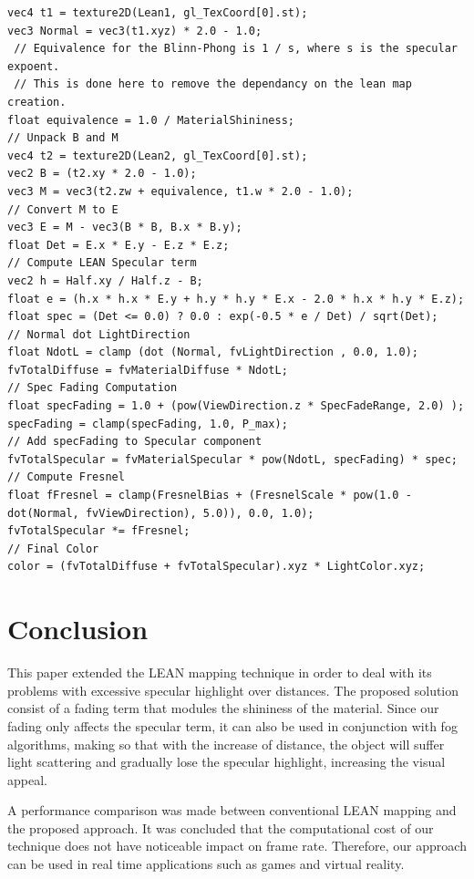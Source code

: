 \documentclass[10pt, conference]{IEEEtran}
\begin{document}
\lstset{basicstyle=\footnotesize,xleftmargin=20pt,numbers=left, breaklines=true, language=C, caption=GLSL pseudo code for specular fading applied in LEAN shader in tangent space., label=GLSLCode}
\begin{lstlisting}
vec4 t1 = texture2D(Lean1, gl_TexCoord[0].st);
vec3 Normal = vec3(t1.xyz) * 2.0 - 1.0;
 // Equivalence for the Blinn-Phong is 1 / s, where s is the specular expoent. 
 // This is done here to remove the dependancy on the lean map creation.
float equivalence = 1.0 / MaterialShininess;
// Unpack B and M
vec4 t2 = texture2D(Lean2, gl_TexCoord[0].st);
vec2 B = (t2.xy * 2.0 - 1.0);
vec3 M = vec3(t2.zw + equivalence, t1.w * 2.0 - 1.0);
// Convert M to E
vec3 E = M - vec3(B * B, B.x * B.y);
float Det = E.x * E.y - E.z * E.z;
// Compute LEAN Specular term
vec2 h = Half.xy / Half.z - B;
float e = (h.x * h.x * E.y + h.y * h.y * E.x - 2.0 * h.x * h.y * E.z);
float spec = (Det <= 0.0) ? 0.0 : exp(-0.5 * e / Det) / sqrt(Det);
// Normal dot LightDirection
float NdotL = clamp (dot (Normal, fvLightDirection , 0.0, 1.0);
fvTotalDiffuse = fvMaterialDiffuse * NdotL;
// Spec Fading Computation
float specFading = 1.0 + (pow(ViewDirection.z * SpecFadeRange, 2.0) );
specFading = clamp(specFading, 1.0, P_max);
// Add specFading to Specular component
fvTotalSpecular = fvMaterialSpecular * pow(NdotL, specFading) * spec;
// Compute Fresnel
float fFresnel = clamp(FresnelBias + (FresnelScale * pow(1.0 - dot(Normal, fvViewDirection), 5.0)), 0.0, 1.0); 
fvTotalSpecular *= fFresnel;
// Final Color
color = (fvTotalDiffuse + fvTotalSpecular).xyz * LightColor.xyz;
\end{lstlisting}

\section{Conclusion}
\label{sec:conclusion}
%
This paper extended the LEAN mapping technique in order to deal with its problems with excessive specular highlight over distances. The proposed solution consist of a fading term that modules the shininess of the material. Since our fading only affects the specular term, it can also be used in conjunction with fog algorithms, making so that with the increase of distance, the object will suffer light scattering and gradually lose the specular highlight, increasing the visual appeal.

A performance comparison was made between conventional LEAN mapping and the proposed approach. It was concluded that the computational cost of our technique does not have noticeable impact on frame rate. Therefore, our approach can be used in real time applications such as games and virtual reality.
\end{document}
